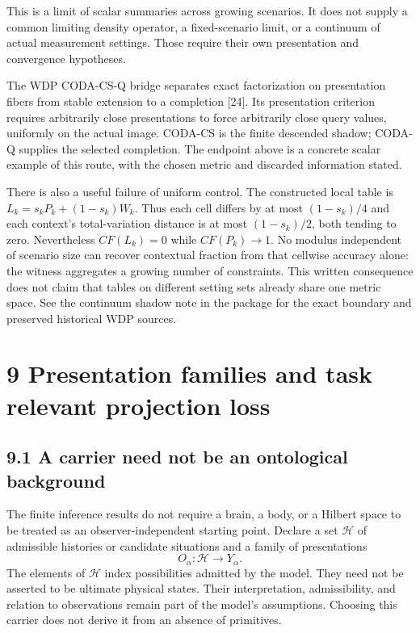 \documentclass[
]{article}
\begin{document}
This is a limit of scalar summaries across growing scenarios. It does
not supply a common limiting density operator, a fixed-scenario limit,
or a continuum of actual measurement settings. Those require their own
presentation and convergence hypotheses.

The WDP CODA-CS-Q bridge separates exact factorization on presentation
fibers from stable extension to a completion {[}24{]}. Its presentation
criterion requires arbitrarily close presentations to force arbitrarily
close query values, uniformly on the actual image. CODA-CS is the finite
descended shadow; CODA-Q supplies the selected completion. The endpoint
above is a concrete scalar example of this route, with the chosen
metric and discarded information stated.

There is also a useful failure of uniform control. The constructed local
table is \(L_k=s_kP_k+(1-s_k)W_k\). Thus each cell differs by at most
\((1-s_k)/4\) and each context's total-variation distance is at most
\((1-s_k)/2\), both tending to zero. Nevertheless \(CF(L_k)=0\) while
\(CF(P_k)\to1\). No modulus independent of scenario size can recover
contextual fraction from that cellwise accuracy alone: the witness
aggregates a growing number of constraints. This written consequence
does not claim that tables on different setting sets already share one
metric space. See the continuum shadow note in the package for the
exact boundary and preserved historical WDP sources.

\section{9 Presentation families and task relevant projection loss}\label{presentation-families-and-task-relevant-projection-loss}

\subsection{9.1 A carrier need not be an ontological background}\label{a-carrier-need-not-be-an-ontological-background}

The finite inference results do not require a brain, a body, or a Hilbert space to be treated as an observer-independent starting point. Declare a set \(\mathcal H\) of admissible histories or candidate situations and a family of presentations
\[
O_\alpha:\mathcal H\longrightarrow Y_\alpha.
\]
The elements of \(\mathcal H\) index possibilities admitted by the model. They need not be asserted to be ultimate physical states. Their interpretation, admissibility, and relation to observations remain part of the model's assumptions. Choosing this carrier does not derive it from an absence of primitives.
\end{document}
